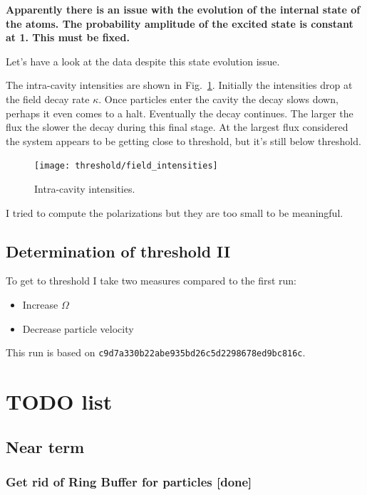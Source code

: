 \documentclass[aps, superscriptaddress, groupedaddress, preprint]{revtex4}
\newcommand\gitrevision[1]{{\tt #1}}
\newcommand\note[1]{{\bf #1}}
\begin{document}
\note{Apparently there is an issue with the evolution of the
  internal state of the atoms.  The probability amplitude of the
  excited state is constant at 1.  This must be fixed.}

Let's have a look at the data despite this state evolution issue.

The intra-cavity intensities are shown in
Fig.~\ref{fig:FieldIntensities}.  Initially the intensities drop
at the field decay rate $\kappa$.  Once particles enter the
cavity the decay slows down, perhaps it even comes to a halt.
Eventually the decay continues.  The larger the flux the slower
the decay during this final stage.  At the largest flux
considered the system appears to be getting close to threshold,
but it's still below threshold.
\begin{figure}
  \texttt{[image: threshold/field\_intensities]}
  \caption{Intra-cavity intensities.}
  \label{fig:FieldIntensities}
\end{figure}

I tried to compute the polarizations but they are too small to be
meaningful.


\subsection{Determination of threshold II}

To get to threshold I take two measures compared to the first
run:
\begin{itemize}

\item Increase $\Omega$

\item Decrease particle velocity

\end{itemize}
This run is based on
\gitrevision{c9d7a330b22abe935bd26c5d2298678ed9bc816c}.


\section{TODO list}

\subsection{Near term}

\subsubsection{Get rid of Ring Buffer for particles {\bf [done]}}
\end{document}

